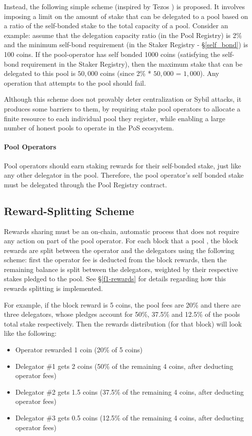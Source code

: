 Instead, the following simple scheme (inspired by Tezos \cite{Goo14}) is proposed. It involves imposing a limit on the amount of stake that can be delegated to a pool based on a ratio of the self-bonded stake to the total capacity of a pool. Consider an example: assume that the delegation capacity ratio (in the Pool Registry) is 2\% and the minimum self-bond requirement (in the Staker Registry - \S\ref{self_bond}) is 100 coins. If the pool-operator has self bonded 1000 coins (satisfying the self-bond requirement in the Staker Registry), then the maximum stake that can be delegated to this pool is $50,000$ coins (since 2\% * $50,000$ = $1,000$). Any operation that attempts to  the pool should fail. 

Although this scheme does not provably deter centralization or Sybil attacks, it produces some barriers to them, by requiring stake pool operators to allocate a finite resource to each individual pool they register, while enabling a large number of honest pools to operate in the PoS ecosystem.

\paragraph*{Pool Operators} Pool operators should earn staking rewards for their self-bonded stake, just like any other delegator in the pool. Therefore, the pool operator's self bonded stake must be delegated through the Pool Registry contract. 


\subsection{Reward-Splitting Scheme} \label{rewards_splitting}
Rewards sharing must be an on-chain, automatic process that does not require any action on part of the pool operator. For each block that a pool , the block rewards are split between the operator and the delegators using the following scheme: first the operator fee is deducted from the block rewards, then the remaining balance is split between the delegators, weighted by their respective stakes pledged to the pool. See \S\ref{f1-rewards} for details regarding how this rewards splitting is implemented. 

For example, if the block reward is 5 coins, the pool fees are 20\% and there are three delegators, whose pledges account for 50\%, 37.5\% and 12.5\% of the pools total stake respectively. Then the rewards distribution (for that block) will look like the following: 
\begin{itemize}[label=--,nosep]
    \item Operator rewarded 1 coin (20\% of 5 coins)
    \item Delegator \#1 gets 2 coins (50\% of the remaining 4 coins, after deducting operator fees)
    \item Delegator \#2 gets 1.5 coins (37.5\% of the remaining 4 coins, after deducting operator fees)
    \item Delegator \#3 gets 0.5 coins (12.5\% of the remaining 4 coins, after deducting operator fees)
\end{itemize}

